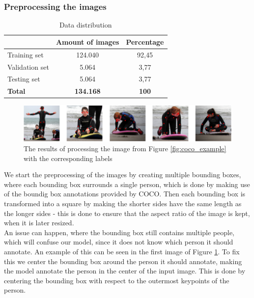 \documentclass[./main.tex]{subfiles}
\begin{document}
\subsubsection{Preprocessing the images}
\begin{table}[H]
    \centering
    \begin{tabular}{l|c|c}
         & Amount of images & Percentage \\
        \hline
        Training set & 124.040 & 92,45 \\
        \hline
        Validation set & 5.064 & 3,77 \\
        \hline
        Testing set & 5.064 & 3,77 \\
        \hline
        \hline
        \textbf{Total} & \textbf{134.168} & \textbf{100} \\
        \hline
    \end{tabular}
    \caption{Data distribution}
    \label{tab:data_distribution}
\end{table}
\begin{figure}[H]
    \centering
    \includegraphics[width = \textwidth - 2 cm]{./entities/crop_img.PNG}
    \caption{The results of processing the image from Figure \ref{fig:coco_example} with the corresponding labels \cite{COCO_article}}
    \label{fig:crop_img}
\end{figure}
We start the preprocessing of the images by creating multiple bounding boxes, where each bounding box surrounds a single person, which is done by making use of the boundig box annotations provided by COCO. Then each bounding box is transformed into a square by making the shorter sides have the same length as the longer sides - this is done to ensure that the aspect ratio of the image is kept, when it is later resized. \\
An issue can happen, where the bounding box still contains multiple people, which will confuse our model, since it does not know which person it should annotate. An example of this can be seen in the first image of Figure \ref{fig:crop_img}. To fix this we center the bounding box around the person it should annotate, making the model annotate the person in the center of the input image. This is done by centering the bounding box with respect to the outermost keypoints of the person. \\
\end{document}
